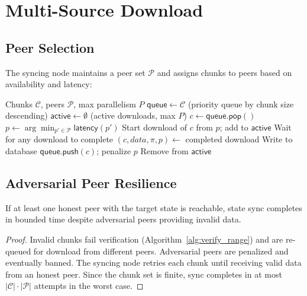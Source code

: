 \section{Multi-Source Download}
\label{sec:multisource}

\subsection{Peer Selection}

The syncing node maintains a peer set $\mathcal{P}$ and assigns chunks to peers based on availability and latency:

\begin{algorithm}[H]
\caption{Multi-Source Chunk Assignment}
\label{alg:multisource}
\begin{algorithmic}[1]
\Require Chunks $\mathcal{C}$, peers $\mathcal{P}$, max parallelism $P$
\State $\mathsf{queue} \gets \mathcal{C}$ (priority queue by chunk size descending)
\State $\mathsf{active} \gets \emptyset$ (active downloads, max $P$)
        \State $c \gets \mathsf{queue}.\mathsf{pop}()$
        \State $p \gets \arg\min_{p' \in \mathcal{P}} \mathsf{latency}(p')$
        \State Start download of $c$ from $p$; add to $\mathsf{active}$
    \EndWhile
    \State Wait for any download to complete
    \State $(c, data, \pi, p) \gets$ completed download
        \State Write to database
    \Else
        \State $\mathsf{queue}.\mathsf{push}(c)$; penalize $p$
    \EndIf
    \State Remove from $\mathsf{active}$
\EndWhile
\end{algorithmic}
\end{algorithm}

\subsection{Adversarial Peer Resilience}

\begin{theorem}
If at least one honest peer with the target state is reachable, state sync completes in bounded time despite adversarial peers providing invalid data.
\end{theorem}

\begin{proof}
Invalid chunks fail verification (Algorithm~\ref{alg:verify_range}) and are re-queued for download from different peers. Adversarial peers are penalized and eventually banned. The syncing node retries each chunk until receiving valid data from an honest peer. Since the chunk set is finite, sync completes in at most $|\mathcal{C}| \cdot |\mathcal{P}|$ attempts in the worst case.
\end{proof}

